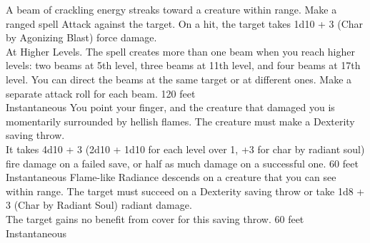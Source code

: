 \documentclass{article}
\begin{document}
    {A beam of crackling energy streaks toward a creature within range. Make a ranged spell Attack against the target. On a hit, the target takes 1d10 + 3 (Char by Agonizing Blast) force damage.
    \\[1mm]
    At Higher Levels. The spell creates more than one beam when you reach higher levels: two beams at 5th level, three beams at 11th level, and four beams at 17th level. You can direct the beams at the same target or at different ones. Make a separate attack roll for each beam.}
    {120 feet\\Instantaneous}%
    {You point your finger, and the creature that damaged you is momentarily surrounded by hellish flames. The creature must make a Dexterity saving throw.
    \\[1mm]
    It takes 4d10 + 3 (2d10 + 1d10 for each level over 1, +3 for char by radiant soul) fire damage on a failed save, or half as much damage on a successful one.}
    {60 feet\\Instantaneous}%
    {Flame-like Radiance descends on a creature that you can see within range. The target must succeed on a Dexterity saving throw or take 1d8 + 3 (Char by Radiant Soul) radiant damage.
    \\[1mm]
    The target gains no benefit from cover for this saving throw.}
    {60 feet\\Instantaneous}%
    
\end{document}
